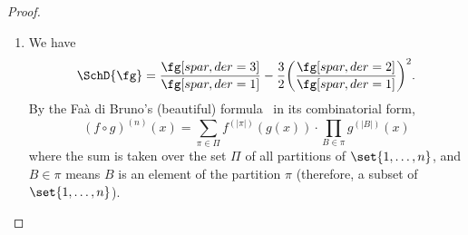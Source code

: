 \documentclass[../main]{subfiles}
\begin{document}
\begin{proof}\hfill
  \NewObject\IFun{}
  \begin{enumerate}
  \item We have
    \begin{equation*}
      \SchD{\fg} = \frac{\fg[spar, der = 3]}{\fg[spar, der = 1]} - \frac{3}{2}\rpar*{\frac{\fg[spar, der = 2]}{\fg[spar, der = 1]}}^2.
    \end{equation*}
    By the Faà di Bruno's (beautiful) formula~\cite[479]{tortoliniAnnaliDiScienze1855} in its combinatorial form,
    \begin{equation*}
      {(f\circ g)^{(n)}(x)=\sum _{\pi \in \Pi }f^{(\left|\pi \right|)}(g(x))\cdot \prod _{B\in \pi }g^{(\left|B\right|)}(x)}
    \end{equation*}
    where the sum is taken over the set \(\Pi\) of all partitions of \(\set{1,\dots,n}\), and \(B \in \pi\) means \(B\) is an element of the partition \(\pi\) (therefore, a subset of \(\set{1,\dots,n}\)).


\end{enumerate}
\end{proof}
\end{document}
